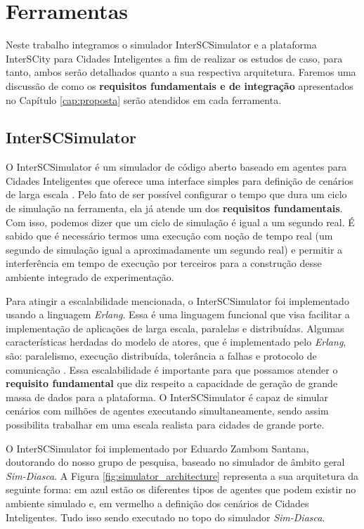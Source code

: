\section{Ferramentas}

Neste trabalho integramos o simulador InterSCSimulator e a plataforma InterSCity para Cidades Inteligentes a fim de realizar os estudos de caso, para tanto, ambos serão detalhados quanto a sua respectiva 
arquitetura.
Faremos uma discussão de como os \textbf{requisitos fundamentais e de integração} apresentados no Capítulo \ref{cap:proposta} serão atendidos em cada ferramenta.

\subsection{InterSCSimulator}

O InterSCSimulator é um simulador de código aberto baseado em agentes para Cidades Inteligentes que oferece uma interface simples para definição de
cenários de larga escala \cite{santana_17}.
Pelo fato de ser possível configurar o tempo que dura um ciclo de simulação na ferramenta, ela já atende um dos \textbf{requisitos fundamentais}.
Com isso, podemos dizer que um ciclo de simulação é igual a um segundo real.
É sabido que é necessário termos uma execução com noção de tempo real (um segundo de simulação igual a aproximadamente um segundo real) e permitir a
interferência em tempo de execução por terceiros para a construção desse ambiente integrado de experimentação.

Para atingir a escalabilidade mencionada, o InterSCSimulator foi implementado usando a linguagem \textit{Erlang}.
Essa é uma linguagem funcional que visa facilitar a implementação de aplicações de larga escala, paralelas e distribuídas.
Algumas características herdadas do modelo de atores, que é implementado pelo \textit{Erlang}, são: paralelismo, execução distribuída, tolerância a falhas e
protocolo de comunicação \cite{santana_17}.
Essa escalabilidade é importante para que possamos atender o \textbf{requisito fundamental} que diz respeito a capacidade de geração de grande massa de dados
para a plataforma.
O InterSCSimulator é capaz de simular cenários com milhões de agentes executando simultaneamente, sendo assim possibilita trabalhar em uma escala realista para cidades de grande porte.

O InterSCSimulator foi implementado por Eduardo Zambom Santana, doutorando do nosso grupo de pesquisa, baseado no simulador de âmbito geral \textit{Sim-Diasca}.
A Figura \ref{fig:simulator_architecture} representa a sua arquitetura da seguinte forma: em azul estão os diferentes tipos de agentes que podem existir no ambiente
simulado e, em vermelho a definição dos cenários de Cidades Inteligentes.
Tudo isso sendo executado no topo do simulador \textit{Sim-Diasca}.

